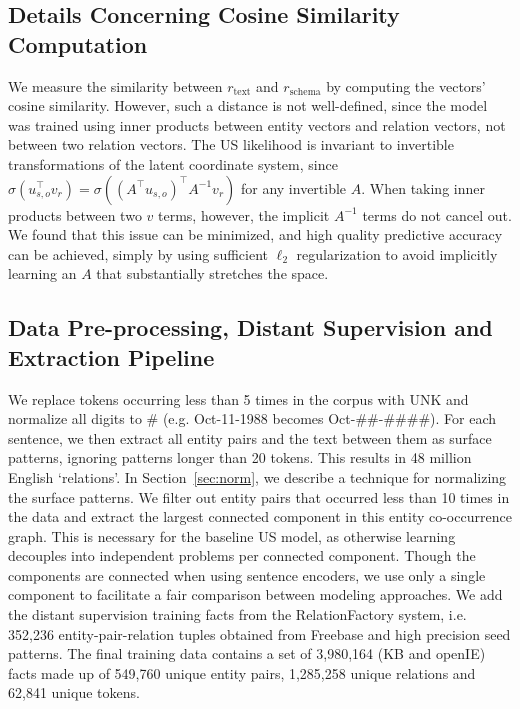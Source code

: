 \subsection{Details Concerning Cosine Similarity Computation \label{app:cosine}}
We measure the similarity between $r_{\text{text}}$ and $r_{\text{schema}}$ by computing the vectors' cosine similarity. However, such a distance is not well-defined, since the model was trained using inner products between entity vectors and relation vectors, not between two relation vectors. The US likelihood is invariant to invertible transformations of the latent coordinate system, since $\sigma\left( u_{s,o}^\top v_r \right) = \sigma\left( (A^\top u_{s,o})^\top A^{-1} v_r \right)$ for any invertible $A$. When taking inner products between two $v$ terms, however, the implicit $A^{-1}$ terms do not cancel out. We found that this issue can be minimized, and high quality predictive accuracy can be achieved, simply by using sufficient $\ell_2$ regularization to avoid implicitly learning an $A$ that substantially stretches the space.

\subsection{Data Pre-processing, Distant Supervision and Extraction Pipeline \label{sec:ds-el}}

We replace tokens occurring less than 5 times in the corpus with UNK and normalize all digits to \# (e.g. Oct-11-1988 becomes Oct-\#\#-\#\#\#\#).
For each sentence, we then extract all entity pairs and the text between them as surface patterns, ignoring patterns longer than 20 tokens.
This results in 48 million English `relations'. In Section~\ref{sec:norm}, we describe a technique for normalizing the surface patterns.
We filter out entity pairs that occurred less than 10 times in the data and extract the largest connected component in this entity co-occurrence graph.
This is necessary for the baseline US model, as otherwise learning decouples into independent problems per connected component.
Though the components are connected when using sentence encoders, we use only a single component to facilitate a fair comparison between modeling approaches.
We add the distant supervision training facts from the RelationFactory system, i.e. 352,236 entity-pair-relation tuples obtained from Freebase and high precision seed patterns.
The final training data contains a set of 3,980,164 (KB and openIE) facts made up of 549,760 unique entity pairs, 1,285,258 unique relations and 62,841 unique tokens.


